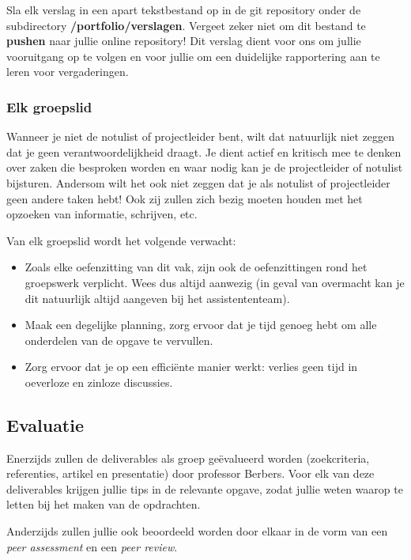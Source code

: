 \documentclass[a4paper]{article}
\begin{document}
Sla elk verslag in een apart tekstbestand op in de git repository onder de subdirectory \textbf{/portfolio/verslagen}.
Vergeet zeker niet om dit bestand te \textbf{pushen} naar jullie online repository!
Dit verslag dient voor ons om jullie vooruitgang op te volgen en voor jullie om een duidelijke rapportering aan te leren voor vergaderingen.


\subsubsection{Elk groepslid}

Wanneer je niet de notulist of projectleider bent, wilt dat natuurlijk niet zeggen dat je geen verantwoordelijkheid draagt.
Je dient actief en kritisch mee te denken over zaken die besproken worden en waar nodig kan je de projectleider of notulist bijsturen.
Andersom wilt het ook niet zeggen dat je als notulist of projectleider geen andere taken hebt!
Ook zij zullen zich bezig moeten houden met het opzoeken van informatie, schrijven, etc.

Van elk groepslid wordt het volgende verwacht:

\begin{itemize}
	\item Zoals elke oefenzitting van dit vak, zijn ook de oefenzittingen rond het groepswerk verplicht. Wees dus altijd aanwezig (in geval van overmacht kan je dit natuurlijk altijd aangeven bij het assistententeam).
	\item Maak een degelijke planning, zorg ervoor dat je tijd genoeg hebt om alle onderdelen van de opgave te vervullen.
	\item Zorg ervoor dat je op een effici\"ente manier werkt: verlies geen tijd in oeverloze en zinloze discussies.
\end{itemize}


\subsection{Evaluatie}

Enerzijds zullen de deliverables als groep ge\"evalueerd worden (zoekcriteria, referenties, artikel en presentatie) door professor Berbers.
Voor elk van deze deliverables krijgen jullie tips in de relevante opgave, zodat jullie weten waarop te letten bij het maken van de opdrachten.

Anderzijds zullen jullie ook beoordeeld worden door elkaar in de vorm van een \textit{peer assessment} en een \textit{peer review}.
\end{document}
